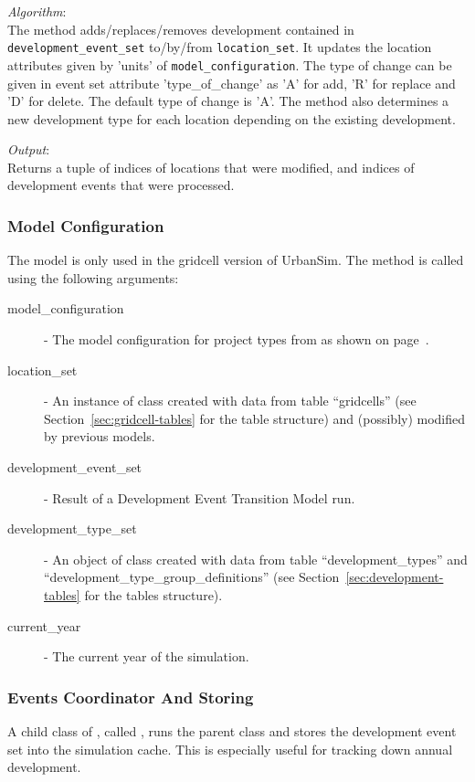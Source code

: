 {\it Algorithm}:\\[1mm]
The method adds/replaces/removes development contained in \verb|development_event_set| 
to/by/from \verb|location_set|. It updates the location attributes
given by 'units' of \verb|model_configuration|. The type of change can be given 
in event set attribute 'type_of_change' as 'A' for add, 'R' for replace and 'D' for delete.
The default type of change is 'A'. The method also determines a new development type 
for each location depending on the existing development. 
 

{\it Output}:~\\[1mm]
Returns a tuple of indices of locations that were modified, and indices of
development events that were processed.

\subsubsection{Model Configuration}
\modelsindex
%
The model is only used in the gridcell version of UrbanSim.
The method  is called using the
following arguments:
\begin{description}
\item[model_configuration] \modelsindex - The model \modelsindex configuration for project types from
   as shown on page~\pageref{page:model-configuration}.
\item[location_set] - An instance of class  created with
  data from table ``gridcells'' (see Section~\ref{sec:gridcell-tables} for the
  table structure) and (possibly) modified by previous models. \modelsindex
\item[development_event_set] - Result of a Development Event Transition Model \modelsindex
  run.
\item[development_type_set] - An object of class 
  created with data from table ``development_types'' and
  ``development_type_group_definitions'' (see
  Section~\ref{sec:development-tables} for the tables structure).
\item[current_year] - The current year of the simulation.
\end{description}

\subsubsection{Events Coordinator And Storing}
%
A child class of , called ,
runs the parent class and stores the development event set into the simulation cache.
This is especially useful for tracking down annual development.

